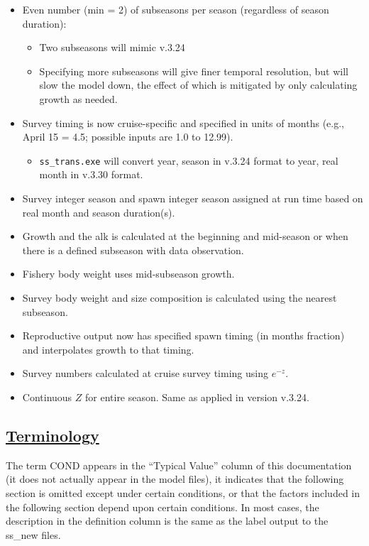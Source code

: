 \begin{itemize}
	\item Even number (min = 2) of subseasons per season (regardless of season duration):
		\begin{itemize}
			\item Two subseasons will mimic v.3.24
			\item Specifying more subseasons will give finer temporal resolution, but will slow the model down, the effect of which is mitigated by only calculating growth as needed.
		\end{itemize}
	\item Survey timing is now cruise-specific and specified in units of months (e.g., April 15 = 4.5; possible inputs are 1.0 to 12.99).
		\begin{itemize}
			\item \texttt{ss\_trans.exe} will convert year, season in v.3.24 format to year, real month in v.3.30 format.
		\end{itemize}
	\item Survey integer season and spawn integer season assigned at run time based on real month and season duration(s).
	\item Growth and the \gls{alk} is calculated at the beginning and mid-season or when there is a defined subseason with data observation.
	\item Fishery body weight uses mid-subseason growth.
	\item Survey body weight and size composition is calculated using the nearest subseason.
	\item Reproductive output now has specified spawn timing (in months fraction) and interpolates growth to that timing.
	\item Survey numbers calculated at cruise survey timing using $e^{-z}$.
	\item Continuous $Z$ for entire season. Same as applied in version v.3.24.
\end{itemize}

\hypertarget{DataTerminology}{}
\subsection[Terminology]{\protect\hyperlink{DataTerminology}{Terminology}}
The term COND appears in the ``Typical Value'' column of this documentation (it does not actually appear in the model files), it indicates that the following section is omitted except under certain conditions, or that the factors included in the following section depend upon certain conditions. In most cases, the description in the definition column is the same as the label output to the ss\_new files.


